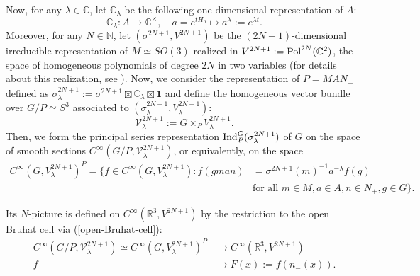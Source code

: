\documentclass[12pt, pdflatex, a4paper]{article}
\theoremstyle{plain}
\theoremstyle{definition}
\def\C{{\mathbb C}}
\def\Ind{\text{\normalfont{Ind}}}
\def\N{{\mathbb N}}
\def\Pol{\text{\normalfont{Pol}}}
\def\R{{\mathbb R}}
\def\V{\mathcal{V}}
\begin{document}
Now, for any $\lambda \in \C$, let $\C_\lambda$ be the following one-dimensional representation of $A$:
\begin{equation*}
\C_\lambda: A \rightarrow \C^\times, \quad a = e^{tH_0} \mapsto a^\lambda := e^{\lambda t}.
\end{equation*}
Moreover, for any $N \in \N$, let $(\sigma^{2N+1}, V^{2N+1})$ be the $(2N+1)$-dimensional irreducible representation of $M \simeq SO(3)$ realized in $V^{2N+1} := \Pol^{2N}(\C^2)$, the space of homogeneous polynomials of degree $2N$ in two variables (for details about this realization, see \cite{Per-Val24}). Now, we consider the representation of $P = MAN_+$ defined as $\sigma_\lambda^{2N+1} := \sigma^{2N+1} \boxtimes \C_\lambda \boxtimes \mathbf{1}$ and define the homogeneous vector bundle over $G/P\simeq S^3$ associated to $(\sigma_\lambda^{2N+1}, V_\lambda^{2N+1}):$
\begin{equation}\label{vectorbundle-V}
\V_\lambda^{2N+1} := G \times_P V_\lambda^{2N+1}.
\end{equation}
Then, we form the principal series representation $\Ind_P^G(\sigma_\lambda^{2N+1})$ of $G$ on the space of smooth sections $C^\infty(G/P, \V_\lambda^{2N+1})$, or equivalently, on the space
\begin{equation*}
\begin{aligned}
C^\infty(G, V_\lambda^{2N+1})^P =
\{f \in C^\infty(G, V_\lambda^{2N+1}) : f(gman) &= \sigma^{2N+1}(m)^{-1} a^{-\lambda}f(g) \\
& \text{for all } m\in M, a\in A, n\in N_+, g\in G\}.
\end{aligned}
\end{equation*}

Its $N$-picture is defined on $C^\infty(\R^3, V^{2N+1})$ by the restriction to the open Bruhat cell via (\ref{open-Bruhat-cell}):
\begin{align*}
C^\infty(G/P, \V_\lambda^{2N+1}) \simeq C^\infty(G, V_\lambda^{2N+1})^P &\longrightarrow C^\infty(\R^3, V^{2N+1})\\
f &\longmapsto F(x) := f(n_-(x)).
\end{align*}
\end{document}
